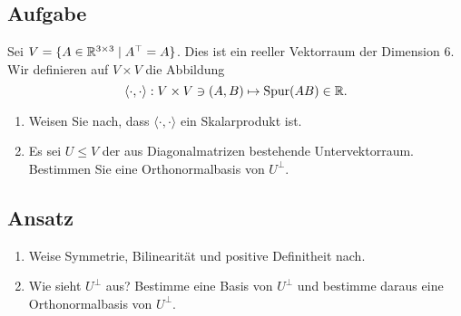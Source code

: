 \subsection{Aufgabe}
Sei \( V = \{ A \in \mathbb{R}^{3 \times 3} \mid A^\top = A \} \). Dies ist ein reeller Vektorraum der Dimension \( 6 \). Wir definieren auf \( V \times V \) die Abbildung
\begin{equation*}
	\langle \cdot, \cdot \rangle : V \times V \ni (A,B) \mapsto \text{Spur}(AB) \in \mathbb{R}\text{.}
\end{equation*}
\begin{enumerate}
	\item Weisen Sie nach, dass \( \langle \cdot, \cdot \rangle \) ein Skalarprodukt ist.
	\item Es sei \( U \leq V \) der aus Diagonalmatrizen bestehende Untervektorraum. Bestimmen Sie eine Orthonormalbasis von \( U^\perp \).
\end{enumerate}

\subsection{Ansatz}
\begin{enumerate}
	\item Weise Symmetrie, Bilinearität und positive Definitheit nach.
	\item Wie sieht \( U^\perp \) aus? Bestimme eine Basis von \( U^\perp \) und bestimme daraus eine Orthonormalbasis von \( U^\perp \). 
\end{enumerate}

